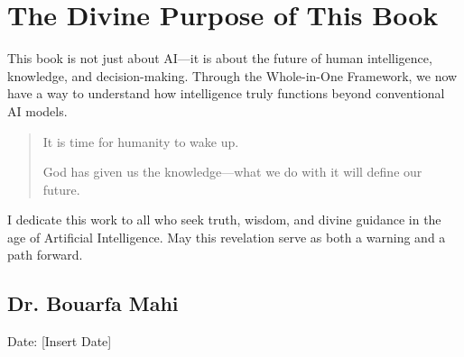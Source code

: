 \documentclass[a4]{article}
\newcommand{\bn}{\bigskip\noindent}
\begin{document}
\section*{The Divine Purpose of This Book}

This book is not just about AI---it is about the future of human intelligence, knowledge, and decision-making. Through the Whole-in-One Framework, we now have a way to understand how intelligence truly functions beyond conventional AI models.  

\begin{quote} 
It is time for humanity to wake up.  

God has given us the knowledge---what we do with it will define our future.  
\end{quote}

\bn
I dedicate this work to all who seek truth, wisdom, and divine guidance in the age of Artificial Intelligence. May this revelation serve as both a warning and a path forward.  

\subsection*{Dr. Bouarfa Mahi}

Date: [Insert Date]  
\end{document}
